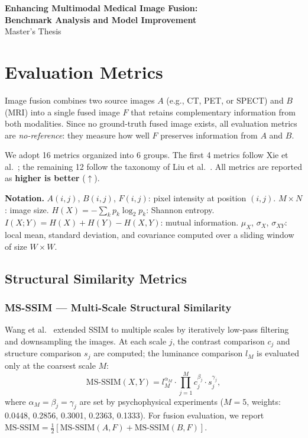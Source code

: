 \documentclass[a4paper,12pt]{article}
\begin{document}
\begin{center}
{\LARGE\bfseries Enhancing Multimodal Medical Image Fusion:\\[0.3em]
Benchmark Analysis and Model Improvement}\\[1.2em]
{\large Master's Thesis}
\end{center}

\tableofcontents
\newpage

\section{Evaluation Metrics}

Image fusion combines two source images $A$ (e.g., CT, PET, or SPECT) and $B$ (MRI)
into a single fused image $F$ that retains complementary information from both modalities.
Since no ground-truth fused image exists, all evaluation metrics are \emph{no-reference}:
they measure how well $F$ preserves information from $A$ and $B$.

We adopt 16 metrics organized into 6 groups. The first 4 metrics follow
Xie et al.~\cite{fusionmamba2024}; the remaining 12 follow the taxonomy of
Liu et al.~\cite{liu2012}.
All metrics are reported as \textbf{higher is better} ($\uparrow$).

\medskip
\noindent\textbf{Notation.}
$A(i,j)$, $B(i,j)$, $F(i,j)$: pixel intensity at position $(i,j)$.
$M \times N$: image size.
$H(X) = -\sum_k p_k \log_2 p_k$: Shannon entropy.
$I(X;Y) = H(X) + H(Y) - H(X,Y)$: mutual information.
$\mu_X$, $\sigma_X$, $\sigma_{XY}$: local mean, standard deviation, and covariance
computed over a sliding window of size $W \times W$.

\subsection{Structural Similarity Metrics}

\subsubsection{MS-SSIM --- Multi-Scale Structural Similarity}

Wang et al.~\cite{wang2003} extended SSIM to multiple scales by iteratively
low-pass filtering and downsampling the images. At each scale $j$, the contrast
comparison $c_j$ and structure comparison $s_j$ are computed; the luminance
comparison $l_M$ is evaluated only at the coarsest scale $M$:
\begin{equation}
  \text{MS-SSIM}(X,Y) = l_M^{\alpha_M} \cdot \prod_{j=1}^{M} c_j^{\beta_j} \cdot s_j^{\gamma_j},
\end{equation}
where $\alpha_M = \beta_j = \gamma_j$ are set by psychophysical experiments
($M=5$, weights: 0.0448, 0.2856, 0.3001, 0.2363, 0.1333).
For fusion evaluation, we report
$\text{MS-SSIM} = \frac{1}{2}[\text{MS-SSIM}(A,F) + \text{MS-SSIM}(B,F)]$.
\end{document}
